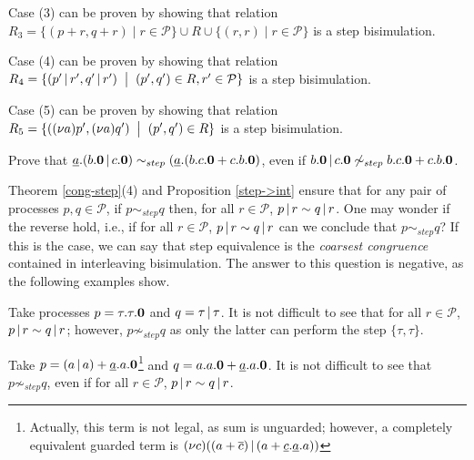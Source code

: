 \begin{theorem}
Case (3) can be proven by showing that relation $R_3 = \{(p + r, q + r) \mid 
r \in \mathcal{P}\} \cup R \cup \{(r, r) \mid r \in \mathcal{P}\}$ is a step bisimulation.

Case (4) can be proven by showing that relation $R_4 =  \{(p' \mbox{$\,|\,$} r', q' \mbox{$\,|\,$} r') \;\;\big|\;\; (p', q') \in R, r' \in \mathcal{P}\}$ 
 is a step bisimulation. 

Case (5) can be proven by showing that relation $R_5 =  \{(\mbox{$({\bf\nu} a)$}p', \mbox{$({\bf\nu} a)$}q') \;\;\big|\;\; (p', q') \in R\}$
 is a step bisimulation.
\fine
\end{theorem}

\begin{exercise}
Prove that  $\underline{a}.(b.\mbox{\bf 0} \mbox{$\,|\,$} c.\mbox{\bf 0})
\sim_{step} (\underline{a}.(b.c.\mbox{\bf 0} + c.b.\mbox{\bf 0})$, even if $b.\mbox{\bf 0} \mbox{$\,|\,$} c.\mbox{\bf 0} \not\sim_{step} b.c.\mbox{\bf 0} + c.b.\mbox{\bf 0}$.
\fine
\end{exercise}

Theorem \ref{cong-step}(4) and Proposition \ref{step->int} ensure that 
for any pair of processes $p, q \in \mathcal{P}$, if $p \sim_{step} q$ then,  for all  $r \in \mathcal{P}$, $p \mbox{$\,|\,$} r \sim q \mbox{$\,|\,$} r$.
One may wonder if the reverse hold, i.e., if for all  $r \in \mathcal{P}$, $p \mbox{$\,|\,$} r \sim q \mbox{$\,|\,$} r$ can we conclude that 
$p \sim_{step} q$? If this is the case, we can say that step equivalence is the {\em coarsest congruence} contained in
interleaving bisimulation. The answer to this question is negative, as the following examples show.

\begin{example}\label{no-tau-coarsest}
Take processes $p = \tau.\tau.\mbox{\bf 0}$ and $q = \tau \mbox{$\,|\,$} \tau$.
It is not difficult to see that for all  $r \in \mathcal{P}$, $p \mbox{$\,|\,$} r \sim q \mbox{$\,|\,$} r$; however, $p \not\sim_{step} q$ 
as only the latter can perform the step $\{\tau, \tau\}$. 
\fine
\end{example}

\begin{example}\label{no-coarsest}
Take $p = (a \mbox{$\,|\,$} a) + \underline{a}.a.\mbox{\bf 0}$\footnote{Actually, this term is not legal, as sum is unguarded; however, 
a completely equivalent guarded term is $\mbox{$({\bf\nu} c)$}((a + \overline{c}) \mbox{$\,|\,$} (a + \underline{c}.\underline{a}.a))$} 
and $q = a.a.\mbox{\bf 0} + \underline{a}.a.\mbox{\bf 0}$. It is not difficult to see that $p \not\sim_{step} q$, even if
for all  $r \in \mathcal{P}$, $p \mbox{$\,|\,$} r \sim q \mbox{$\,|\,$} r$.
\fine
\end{example}






